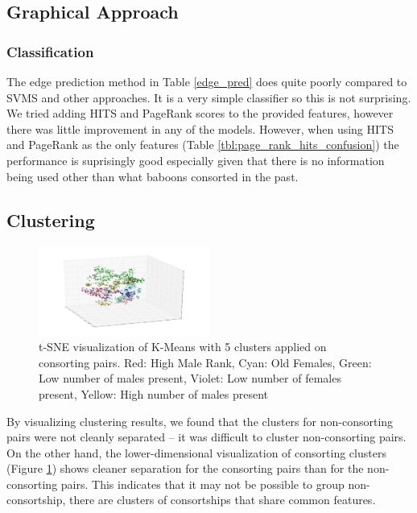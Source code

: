 \documentclass[twoside,twocolumn,paper=letter,fontsize=11pt]{article}
\begin{document}

\subsection{Graphical Approach}
\subsubsection*{Classification}

The edge prediction method in Table \ref{edge_pred} does quite poorly compared to SVMS and other approaches. It is a very simple classifier so this is not surprising. We tried adding HITS and PageRank scores to the provided features, however there was little improvement in any of the models. However, when using HITS and PageRank as the only features (Table \ref{tbl:page_rank_hits_confusion}) the performance is suprisingly good especially given that there is no information being used other than what baboons consorted in the past. %

\subsection{Clustering}
\begin{figure}[h]
      \centering
          \includegraphics[width=0.5\textwidth]{../figs/consort_kmeans_5_3d_tsne.png}
  \caption{t-SNE visualization of K-Means with 5 clusters applied on consorting
  pairs. Red: High Male Rank, Cyan: Old Females, Green: Low number of males
present, Violet: Low number of females present, Yellow: High number of males
present}
  \label{fig:consort_clustering_vis}
\end{figure}

By visualizing clustering results, we found that the clusters for non-consorting
pairs were not cleanly separated -- it was difficult to cluster non-consorting
pairs. On the other hand, the lower-dimensional visualization of consorting
clusters  (Figure \ref{fig:consort_clustering_vis}) shows cleaner separation for
the consorting pairs than for the non-consorting pairs. This indicates that it
may not be possible to group non-consortship, there are clusters of consortships
that share common features.
\end{document}
